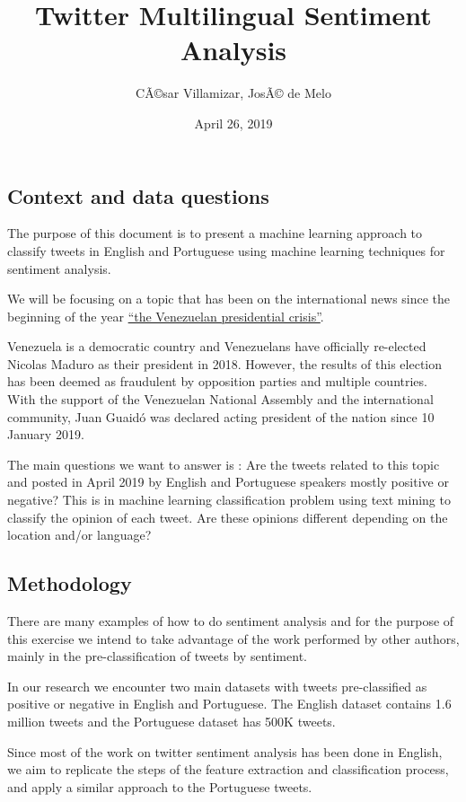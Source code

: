 \documentclass[]{article}
\title{Twitter Multilingual Sentiment Analysis}
\author{CÃ©sar Villamizar, JosÃ© de Melo}
\date{April 26, 2019}
\begin{document}
\maketitle

\subsection{Context and data
questions}\label{context-and-data-questions}

The purpose of this document is to present a machine learning approach
to classify tweets in English and Portuguese using machine learning
techniques for sentiment analysis.

We will be focusing on a topic that has been on the international news
since the beginning of the year
\href{https://en.wikipedia.org/wiki/2019_Venezuelan_presidential_crisis}{``the
Venezuelan presidential crisis''}.

Venezuela is a democratic country and Venezuelans have officially
re-elected Nicolas Maduro as their president in 2018. However, the
results of this election has been deemed as fraudulent by opposition
parties and multiple countries. With the support of the Venezuelan
National Assembly and the international community, Juan Guaidó was
declared acting president of the nation since 10 January 2019.

The main questions we want to answer is : Are the tweets related to this
topic and posted in April 2019 by English and Portuguese speakers mostly
positive or negative? This is in machine learning classification problem
using text mining to classify the opinion of each tweet. Are these
opinions different depending on the location and/or language?

\subsection{Methodology}\label{methodology}

There are many examples of how to do sentiment analysis and for the
purpose of this exercise we intend to take advantage of the work
performed by other authors, mainly in the pre-classification of tweets
by sentiment.

In our research we encounter two main datasets with tweets
pre-classified as positive or negative in English and Portuguese. The
English dataset contains 1.6 million tweets and the Portuguese dataset
has 500K tweets.

Since most of the work on twitter sentiment analysis has been done in
English, we aim to replicate the steps of the feature extraction and
classification process, and apply a similar approach to the Portuguese
tweets.
\end{document}
